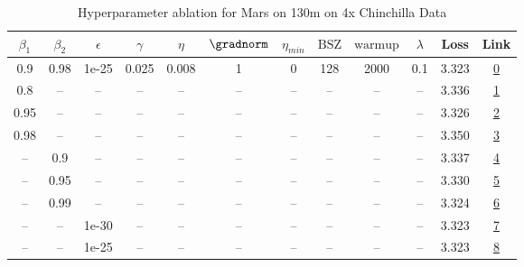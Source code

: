 \begin{table}[H]
\centering
\caption{Hyperparameter ablation for Mars on 130m on 4x Chinchilla Data}
\label{tab:ablation_mars_130m_on_4x_chinchilla_data}
\begin{tabular}{cccccccccccc}
\toprule
$\beta_1$ & $\beta_2$ & $\epsilon$ & $\gamma$ & $\eta$ & $\gradnorm$ & $\eta_{min}$ & $\mathrm{BSZ}$ & $\mathrm{warmup}$ & $\lambda$ & Loss & Link \\
\midrule
0.9 & 0.98 & 1e-25 & 0.025 & 0.008 & 1 & 0 & 128 & 2000 & 0.1 & 3.323 & \href{https://wandb.ai/stanford-mercury/optimizer-scaling/runs/sweep-130m-10B-marsb8cf3flr0.008-wd0.1-minlr0-warmup2000-b10.9-b-5a2278}{0} \\
\midrule
0.8 & -- & -- & -- & -- & -- & -- & -- & -- & -- & 3.336 & \href{https://wandb.ai/stanford-mercury/optimizer-scaling/runs/sweep-130m-10B-marsa0cf09lr0.008-wd0.1-minlr0-warmup2000-b10.8-b-2eb328}{1} \\
0.95 & -- & -- & -- & -- & -- & -- & -- & -- & -- & 3.326 & \href{https://wandb.ai/stanford-mercury/optimizer-scaling/runs/sweep-130m-10B-mars1ddcddlr0.008-wd0.1-minlr0-warmup2000-b10.95--f05d16}{2} \\
0.98 & -- & -- & -- & -- & -- & -- & -- & -- & -- & 3.350 & \href{https://wandb.ai/stanford-mercury/optimizer-scaling/runs/sweep-130m-10B-mars1125cblr0.008-wd0.1-minlr0-warmup2000-b10.98--06efb4}{3} \\
-- & 0.9 & -- & -- & -- & -- & -- & -- & -- & -- & 3.337 & \href{https://wandb.ai/stanford-mercury/optimizer-scaling/runs/sweep-130m-10B-marsbf9ae8lr0.008-wd0.1-minlr0-warmup2000-b10.9-b-77968a}{4} \\
-- & 0.95 & -- & -- & -- & -- & -- & -- & -- & -- & 3.330 & \href{https://wandb.ai/stanford-mercury/optimizer-scaling/runs/sweep-130m-10B-marsa8c868lr0.008-wd0.1-minlr0-warmup2000-b10.9-b-e43f81}{5} \\
-- & 0.99 & -- & -- & -- & -- & -- & -- & -- & -- & 3.324 & \href{https://wandb.ai/stanford-mercury/optimizer-scaling/runs/sweep-130m-10B-mars7e0a59lr0.008-wd0.1-minlr0-warmup2000-b10.9-b-53135f}{6} \\
-- & -- & 1e-30 & -- & -- & -- & -- & -- & -- & -- & 3.323 & \href{https://wandb.ai/stanford-mercury/optimizer-scaling/runs/sweep-130m-10B-marsb8cf3flr0.008-wd0.1-minlr0-warmup2000-b10.9-b-5a2278}{7} \\
-- & -- & 1e-25 & -- & -- & -- & -- & -- & -- & -- & 3.323 & \href{https://wandb.ai/stanford-mercury/optimizer-scaling/runs/sweep-130m-10B-marsb8cf3flr0.008-wd0.1-minlr0-warmup2000-b10.9-b-5a2278}{8} \\

\end{tabular}
\end{table}
